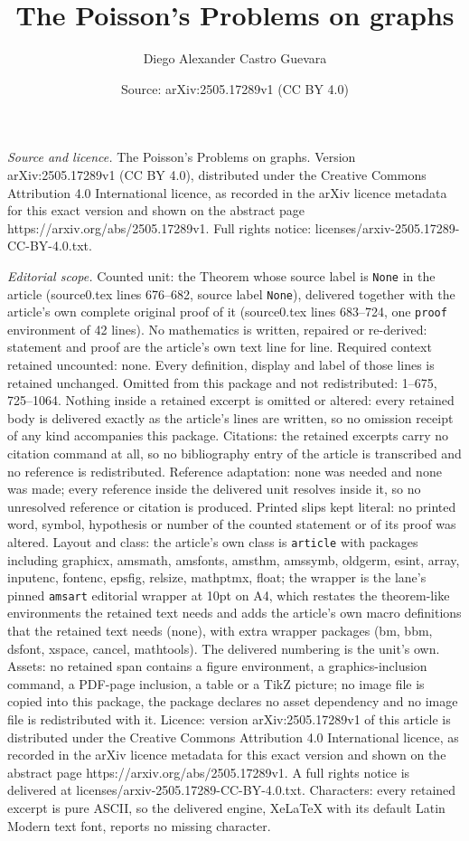 \documentclass[10pt,a4paper]{amsart}
\title[The Poisson's Problems on graphs]{The Poisson's Problems on graphs}
\author{Diego Alexander Castro Guevara}
\date{Source: arXiv:2505.17289v1 (CC BY 4.0)}
\begin{document}
\maketitle

\noindent\emph{Source and licence.} The Poisson's Problems on graphs. Version arXiv:2505.17289v1 (CC BY 4.0), distributed under the Creative Commons Attribution 4.0 International licence, as recorded in the arXiv licence metadata for this exact version and shown on the abstract page https://arxiv.org/abs/2505.17289v1. Full rights notice: licenses/arxiv-2505.17289-CC-BY-4.0.txt.\par\smallskip

\noindent\textit{Editorial scope.} Counted unit: the Theorem whose source label is \texttt{None} in the article (source0.tex lines 676--682, source label \texttt{None}), delivered together with the article's own complete original proof of it (source0.tex lines 683--724, one \texttt{proof} environment of 42 lines). No mathematics is written, repaired or re-derived: statement and proof are the article's own text line for line. Required context retained uncounted: none. Every definition, display and label of those lines is retained unchanged. Omitted from this package and not redistributed: 1--675, 725--1064. Nothing inside a retained excerpt is omitted or altered: every retained body is delivered exactly as the article's lines are written, so no omission receipt of any kind accompanies this package. Citations: the retained excerpts carry no citation command at all, so no bibliography entry of the article is transcribed and no reference is redistributed. Reference adaptation: none was needed and none was made; every reference inside the delivered unit resolves inside it, so no unresolved reference or citation is produced. Printed slips kept literal: no printed word, symbol, hypothesis or number of the counted statement or of its proof was altered. Layout and class: the article's own class is \texttt{article} with packages including graphicx, amsmath, amsfonts, amsthm, amssymb, oldgerm, esint, array, inputenc, fontenc, epsfig, relsize, mathptmx, float; the wrapper is the lane's pinned \texttt{amsart} editorial wrapper at 10pt on A4, which restates the theorem-like environments the retained text needs and adds the article's own macro definitions that the retained text needs (none), with extra wrapper packages (bm, bbm, dsfont, xspace, cancel, mathtools). The delivered numbering is the unit's own. Assets: no retained span contains a figure environment, a graphics-inclusion command, a PDF-page inclusion, a table or a TikZ picture; no image file is copied into this package, the package declares no asset dependency and no image file is redistributed with it. Licence: version arXiv:2505.17289v1 of this article is distributed under the Creative Commons Attribution 4.0 International licence, as recorded in the arXiv licence metadata for this exact version and shown on the abstract page https://arxiv.org/abs/2505.17289v1. A full rights notice is delivered at licenses/arxiv-2505.17289-CC-BY-4.0.txt. Characters: every retained excerpt is pure ASCII, so the delivered engine, XeLaTeX with its default Latin Modern text font, reports no missing character.
\end{document}
